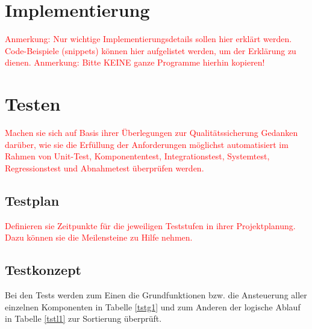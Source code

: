 \documentclass[a4paper, 11pt]{article}
\begin{document}
\section{Implementierung}
\textcolor{red}{Anmerkung: Nur wichtige Implementierungsdetails sollen hier erklärt werden. Code-Beispiele (snippets) können hier aufgelistet werden, um der Erklärung zu dienen. 
Anmerkung: Bitte KEINE ganze Programme hierhin kopieren!
}

\section{Testen}
\textcolor{red}{Machen sie sich auf Basis ihrer Überlegungen zur Qualitätssicherung Gedanken darüber, wie sie die Erfüllung der Anforderungen möglichst automatisiert im Rahmen von Unit-Test, Komponententest, Integrationstest, Systemtest, Regressionstest und Abnahmetest überprüfen werden.}

\subsection{Testplan}
\textcolor{red}{Definieren sie Zeitpunkte für die jeweiligen Teststufen in ihrer Projektplanung. Dazu können sie die Meilensteine zu Hilfe nehmen.}

\newpage

\subsection{Testkonzept}
Bei den Tests werden zum Einen die Grundfunktionen bzw. die Ansteuerung aller einzelnen Komponenten in Tabelle \ref{tstg1} und zum Anderen der logische Ablauf in Tabelle \ref{tstl1} zur Sortierung überprüft.
\end{document}
